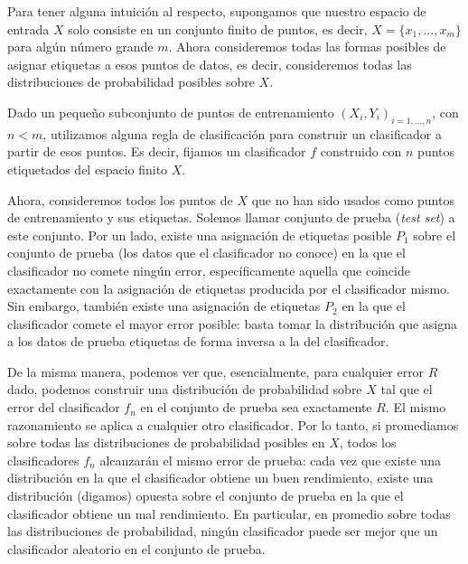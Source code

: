 \documentclass{report}
\begin{document}
Para tener alguna intuición al respecto, supongamos que nuestro espacio de entrada \(X\) solo consiste en un conjunto finito de puntos, es decir, 
\(X = \{x_1, \dots, x_m\}\) para algún número grande \(m\). Ahora consideremos todas las formas 
posibles de asignar etiquetas a esos puntos de datos, es decir, consideremos todas las distribuciones 
de probabilidad posibles sobre \(X\). \newline

Dado un pequeño subconjunto de puntos de entrenamiento \((X_i, Y_i)_{i=1,\dots,n}\), con $n<m$, utilizamos 
alguna regla de clasificación para construir un clasificador a partir de esos puntos. Es decir, fijamos un clasificador $f$
construido con $n$ puntos etiquetados del espacio finito \(X\).\newline

Ahora, consideremos todos los puntos de \(X\) que no han sido usados como 
puntos de entrenamiento y sus etiquetas. Solemos llamar conjunto de prueba (\textit{test set}) a este conjunto.
Por un lado, existe una asignación de etiquetas posible \(P_1\) sobre el conjunto de prueba (los datos que el clasificador
no conoce) en la que el 
clasificador no comete ningún error, específicamente aquella que coincide exactamente con la asignación 
de etiquetas producida por el clasificador mismo. Sin embargo, también existe una asignación de 
etiquetas \(P_2\) en la que el clasificador comete el mayor error posible: basta tomar la distribución
que asigna a los datos de prueba etiquetas de forma inversa a la del clasificador. \newline

De la misma manera, podemos ver que, esencialmente, para cualquier error \(R\) dado, podemos 
construir una distribución de probabilidad sobre \(X\) tal que el error del clasificador \(f_n\) en el 
conjunto de prueba sea exactamente \(R\). El mismo razonamiento se aplica a cualquier otro 
clasificador. Por lo tanto, si promediamos sobre todas las distribuciones de probabilidad posibles en \(X\), 
todos los clasificadores \(f_n\) alcanzarán el mismo error de prueba: cada vez que existe una 
distribución en la que el clasificador obtiene un buen rendimiento, existe una distribución 
(digamos) opuesta sobre el conjunto de prueba en la que el clasificador obtiene un mal rendimiento.
En particular, en promedio sobre todas las distribuciones de probabilidad, ningún 
clasificador puede ser mejor que un clasificador aleatorio en el conjunto de prueba.\newline
\end{document}
